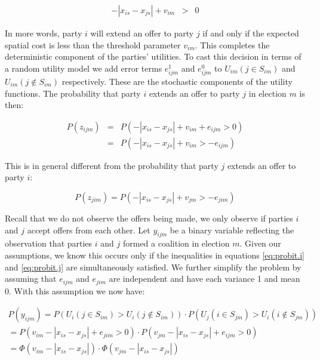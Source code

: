 \begin{eqnarray}
  \label{eq:u2}
  - |x_{is}-x_{js}| +  v_{im}&>&0
\end{eqnarray}

In more words, party $i$ will extend an offer to   party $j$  if and only if the  expected spatial cost is less than the threshold parameter $v_{im}$. This completes the deterministic component of the parties' utilities. To cast this decision in terms of a random utility model we add error terms $e^1_{ijm}$  and $e^0_{ijm}$   to  $U_{im}(j\in S_{im})$ and $U_{im}(j\not\in S_{im})$ respectively. These are the stochastic components of the utility functions. The probability that party $i$ extends an offer to party $j$ in election $m$ is then:

\begin{eqnarray}
  \label{eq:probit.i}
P(z_{ijm}) &=&P(-|x_{is}-x_{js}| +  v_{im} + e_{ijm}  >0)  \\
  &=&P(-|x_{is}-x_{js}|  +v_{im}   >-e_{ijm}  )
\end{eqnarray}

This is in general different from the probability that party $j$ extends an offer to party $i$:

\begin{equation}
  \label{eq:probit.j}
  P(z_{jim})=P(-|x_{is}-x_{js}| +  v_{jm}   >-e_{jim}  )
\end{equation}

Recall that we do not observe the offers being made, we only observe if parties $i$ and $j$ accept offers from each other. Let $y_{ijm}$ be a binary variable reflecting the observation that parties $i$ and $j$ formed a coalition in election $m$. Given our assumptions, we know this occurs only if the inequalities in equations \ref{eq:probit.i}  and \ref{eq:probit.j} are simultaneously satisfied. We further simplify the problem by assuming that $e_{ijm}$ and $e_{jim}$ are independent and have each variance 1 and mean 0. With this assumption we now have:

\begin{eqnarray}
  \label{eq:ru1}
  P(y_{ijm})=P(U_i(j \in S_{im})>U_i(j\not \in S_{im})) \cdot P(U_j(i\in S_{jm})>U_i(i\not\in S_{jm}))\\
  =P(v_{im}-|x_{is}-x_{js}|+e_{jim}>0) \cdot P(v_{jm}-|x_{is}-x_{js}|+e_{ijm}>0) \\
  =\Phi(v_{im}-|x_{is}-x_{js}|) \cdot \Phi(v_{jm}-|x_{is}-x_{js}|)
\end{eqnarray}


